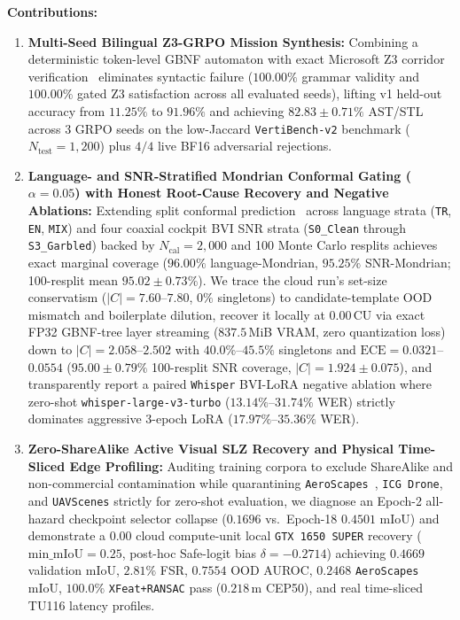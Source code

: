 \documentclass[10pt]{article}
\begin{document}
\textbf{Contributions:}
\begin{enumerate}
  \item \textbf{Multi-Seed Bilingual Z3-GRPO Mission Synthesis:} Combining a deterministic token-level GBNF automaton with exact Microsoft Z3 corridor verification~\cite{demoura_z3_2008} eliminates syntactic failure ($100.00\%$ grammar validity and $100.00\%$ gated Z3 satisfaction across all evaluated seeds), lifting v1 held-out accuracy from $11.25\%$ to $91.96\%$ and achieving $82.83 \pm 0.71\%$ AST/STL across 3 GRPO seeds on the low-Jaccard \texttt{VertiBench-v2} benchmark ($N_{\text{test}}=1{,}200$) plus $4/4$ live BF16 adversarial rejections.
  \item \textbf{Language- and SNR-Stratified Mondrian Conformal Gating ($\alpha=0.05$) with Honest Root-Cause Recovery and Negative Ablations:} Extending split conformal prediction~\cite{vovk_conformal_2005,ren_knowno_2023} across language strata (\texttt{TR}, \texttt{EN}, \texttt{MIX}) and four coaxial cockpit BVI SNR strata (\texttt{S0\_Clean} through \texttt{S3\_Garbled}) backed by $N_{\text{cal}}=2{,}000$ and 100 Monte Carlo resplits achieves exact marginal coverage ($96.00\%$ language-Mondrian, $95.25\%$ SNR-Mondrian; 100-resplit mean $95.02 \pm 0.73\%$). We trace the cloud run's set-size conservatism ($|C|=7.60$--$7.80$, $0\%$ singletons) to candidate-template OOD mismatch and boilerplate dilution, recover it locally at $0.00$\,CU via exact FP32 GBNF-tree layer streaming ($837.5$\,MiB VRAM, zero quantization loss) down to $|C|=2.058$--$2.502$ with $40.0\%$--$45.5\%$ singletons and $\text{ECE}=0.0321$--$0.0554$ ($95.00 \pm 0.79\%$ 100-resplit SNR coverage, $|C|=1.924 \pm 0.075$), and transparently report a paired \texttt{Whisper} BVI-LoRA negative ablation where zero-shot \texttt{whisper-large-v3-turbo} ($13.14\%$--$31.74\%$ WER) strictly dominates aggressive 3-epoch LoRA ($17.97\%$--$35.36\%$ WER).
  \item \textbf{Zero-ShareAlike Active Visual SLZ Recovery and Physical Time-Sliced Edge Profiling:} Auditing training corpora to exclude ShareAlike and non-commercial contamination while quarantining \texttt{AeroScapes}~\cite{nigam_aeroscapes_2018}, \texttt{ICG~Drone}, and \texttt{UAVScenes} strictly for zero-shot evaluation, we diagnose an Epoch-2 all-hazard checkpoint selector collapse ($0.1696$ vs.\ Epoch-18 $0.4501$ mIoU) and demonstrate a $0.00$ cloud compute-unit local \texttt{GTX~1650~SUPER} recovery ($\mathrm{min\_mIoU}=0.25$, post-hoc Safe-logit bias $\delta=-0.2714$) achieving $0.4669$ validation mIoU, $2.81\%$ FSR, $0.7554$ OOD AUROC, $0.2468$ \texttt{AeroScapes} mIoU, $100.0\%$ \texttt{XFeat+RANSAC} pass ($0.218$\,m CEP50), and real time-sliced TU116 latency profiles.
\end{enumerate}
\end{document}
